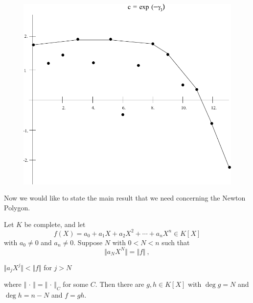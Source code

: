\begin{figure}
\includegraphics[width=\textwidth]{fig_3.pdf}
\caption{}
\label{fig:3}
\end{figure}

Now we would like to state the main result that we need concerning the Newton Polygon.

\begin{theo}[``Newton'']
\label{t3.2.3}
Let $K$ be complete, and let
$$
f(X)=a_{0}+a_{1}X+a_{2}X^{2}+\cdots+a_{n}X^{n}\in K[X]
$$
with $a_{0}\neq 0$ and $a_{n}\neq 0$. Suppose $N$ with $0<N<n$ such that
$$
\Vert a_{N}X^{N}\Vert=\Vert f\Vert\ ,
$$
\begin{center}
$\Vert a_{j}X^{j}\Vert<\Vert f\Vert$ for $j>N$
\end{center}
where $\Vert\, \cdot\, \Vert=\Vert\, \cdot\, \Vert_{C}$ for some $C$. Then there are $g,h\in K[X]$ with $\deg g=N$ and $\deg h=n-N$ and $f=gh$.
\end{theo}

